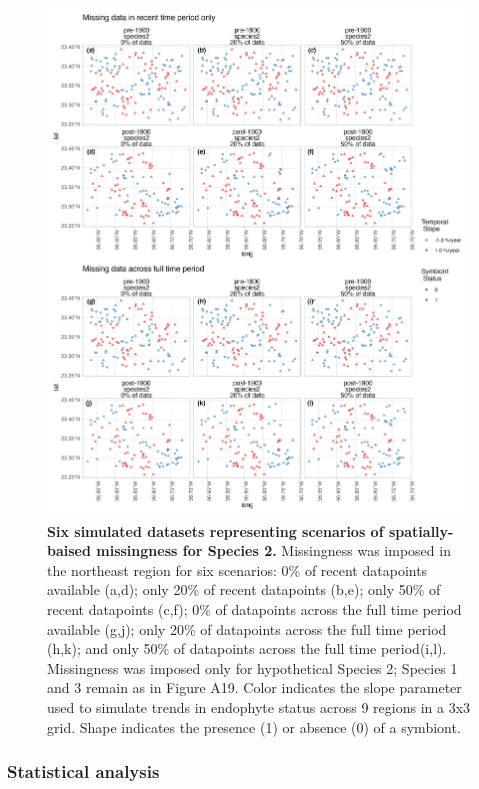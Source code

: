 \documentclass[11pt]{article}
\begin{document}
{\begin{figure}[H]
	\centering
	\includegraphics[width = .8\linewidth]{../Plots/sample_size_species2data_plot.png}
	\caption[Six simulated datasets representing scenarios of spatially-baised missingness for Species 2]{\textbf{Six simulated datasets representing scenarios of spatially-baised missingness for Species 2.} Missingness was imposed in the northeast region for six scenarios: 0\% of recent datapoints available (a,d); only 20\% of recent datapoints (b,e); only 50\% of recent datapoints (c,f); 0\% of datapoints across the full time period available (g,j); only 20\% of datapoints across the full time period (h,k); and only 50\% of datapoints across the full time period(i,l). Missingness was imposed only for hypothetical Species 2; Species 1 and 3 remain as in Figure A19. Color indicates the slope parameter used to simulate trends in endophyte status across 9 regions in a 3x3 grid. Shape indicates the presence (1) or absence (0) of a symbiont. }
	\label{fig:sample_size_species2data_plot}
\end{figure}

\subsubsection*{Statistical analysis}
	\setcounter{equation}{0}

\renewcommand{\theequation}{A\arabic{equation}}

}
\end{document}
